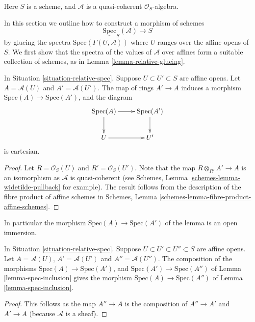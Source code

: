 \begin{situation}
\label{situation-relative-spec}
Here $S$ is a scheme, and $\mathcal{A}$
is a quasi-coherent $\mathcal{O}_S$-algebra.
\end{situation}

\noindent
In this section we outline how to construct a morphism
of schemes
$$
\underline{\text{Spec}}_S(\mathcal{A}) \longrightarrow S
$$
by glueing the spectra $\text{Spec}(\Gamma(U, \mathcal{A}))$
where $U$ ranges over the affine opens of $S$. We first show that the
spectra of the values of $\mathcal{A}$ over affines form a
suitable collection of schemes, as in Lemma \ref{lemma-relative-glueing}.

\begin{lemma}
\label{lemma-spec-inclusion}
In Situation \ref{situation-relative-spec}.
Suppose $U \subset U' \subset S$ are affine opens.
Let $A = \mathcal{A}(U)$ and $A' = \mathcal{A}(U')$.
The map of rings $A' \to A$ induces a morphism
$\text{Spec}(A) \to \text{Spec}(A')$, and the diagram
$$
\xymatrix{
\text{Spec}(A) \ar[r] \ar[d] &
\text{Spec}(A') \ar[d] \\
U \ar[r] &
U'
}
$$
is cartesian.
\end{lemma}

\begin{proof}
Let $R = \mathcal{O}_S(U)$ and $R' = \mathcal{O}_S(U')$.
Note that the map $R \otimes_{R'} A' \to A$ is an isomorphism as
$\mathcal{A}$ is quasi-coherent
(see Schemes, Lemma \ref{schemes-lemma-widetilde-pullback} for example).
The result follows from the description of the fibre product of
affine schemes in
Schemes, Lemma \ref{schemes-lemma-fibre-product-affine-schemes}.
\end{proof}

\noindent
In particular the morphism $\text{Spec}(A) \to \text{Spec}(A')$
of the lemma is an open immersion.

\begin{lemma}
\label{lemma-transitive-spec}
In Situation \ref{situation-relative-spec}.
Suppose $U \subset U' \subset U'' \subset S$ are affine opens.
Let $A = \mathcal{A}(U)$, $A' = \mathcal{A}(U')$ and $A'' = \mathcal{A}(U'')$.
The composition of the morphisms
$\text{Spec}(A) \to \text{Spec}(A')$, and
$\text{Spec}(A') \to \text{Spec}(A'')$ of
Lemma \ref{lemma-spec-inclusion} gives the
morphism $\text{Spec}(A) \to \text{Spec}(A'')$
of Lemma \ref{lemma-spec-inclusion}.
\end{lemma}

\begin{proof}
This follows as the map $A'' \to A$ is the composition of $A'' \to A'$ and
$A' \to A$ (because $\mathcal{A}$ is a sheaf).
\end{proof}


